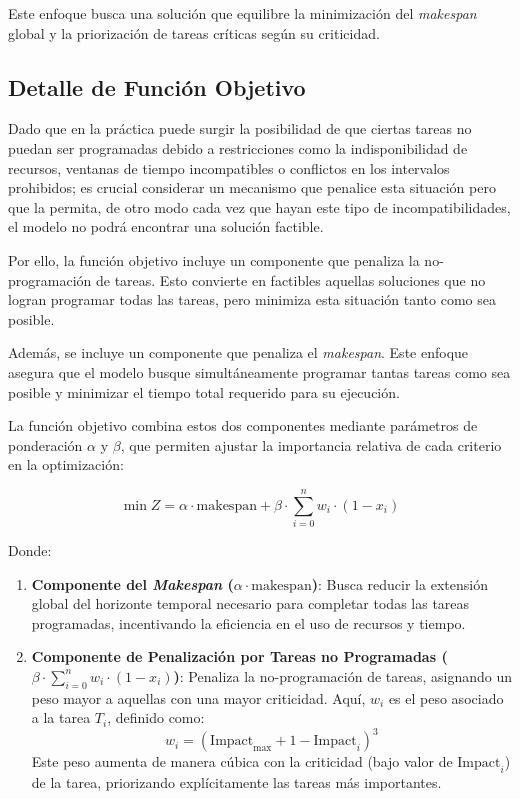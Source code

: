 \documentclass{article}
\begin{document}
Este enfoque busca una solución que equilibre la minimización del \textit{makespan} global y la priorización de tareas críticas según su criticidad.


\subsection{Detalle de Función Objetivo}

Dado que en la práctica puede surgir la posibilidad de que ciertas tareas no puedan ser programadas debido a restricciones como la indisponibilidad de recursos, ventanas de tiempo incompatibles o conflictos en los intervalos prohibidos; es crucial considerar un mecanismo que penalice esta situación pero que la permita, de otro modo cada vez que hayan este tipo de incompatibilidades, el modelo no podrá encontrar una solución factible. 

Por ello, la función objetivo incluye un componente que penaliza la no-programación de tareas. Esto convierte en factibles aquellas soluciones que no logran programar todas las tareas, pero minimiza esta situación tanto como sea posible.

Además, se incluye un componente que penaliza el \textit{makespan}. Este enfoque asegura que el modelo busque simultáneamente programar tantas tareas como sea posible y minimizar el tiempo total requerido para su ejecución.

La función objetivo combina estos dos componentes mediante parámetros de ponderación \( \alpha \) y \( \beta \), que permiten ajustar la importancia relativa de cada criterio en la optimización:

\[
\min Z = \alpha \cdot \text{makespan} + \beta \cdot \sum_{i=0}^{n} w_i \cdot (1 - x_i)
\]

Donde:

\begin{enumerate}
    \item \textbf{Componente del \textit{Makespan} (\( \alpha \cdot \text{makespan} \))}: Busca reducir la extensión global del horizonte temporal necesario para completar todas las tareas programadas, incentivando la eficiencia en el uso de recursos y tiempo.

    \item \textbf{Componente de Penalización por Tareas no Programadas (\( \beta \cdot \sum_{i=0}^{n} w_i \cdot (1 - x_i) \))}: Penaliza la no-programación de tareas, asignando un peso mayor a aquellas con una mayor criticidad. Aquí, \( w_i \) es el peso asociado a la tarea \( T_i \), definido como:
    \[
    w_i = (\text{Impact}_{\text{max}} + 1 - \text{Impact}_i)^3
    \]
    Este peso aumenta de manera cúbica con la criticidad (bajo valor de \( \text{Impact}_i \)) de la tarea, priorizando explícitamente las tareas más importantes.
\end{enumerate}
\end{document}
